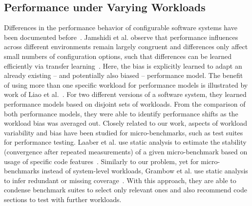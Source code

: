 \subsection{Performance under Varying Workloads}
Differences in the performance behavior of configurable software systems have been documented before~\cite{jamishidi_transfer_2017,alves_sampling_2020}. Jamshidi et al. observe that performance influences across different environments remain largely congruent and differences only affect small numbers of configuration options, such that differences can be learned efficiently via transfer learning~\cite{jamishidi_transfer_2017,jamshidi_learning_2018,jamshidi_transfer_gp_2017,ding_bayesian_2020}. Here, the bias is explicitly learned to adapt an already existing – and potentially also biased -- performance model. The benefit of using more than one specific workload for performance models is illustrated by work of Liao et al.~\cite{liao_2020_using_emse}. For two different versions of a software system, they learned performance models based on disjoint sets of workloads. From the comparison of both performance models, they were able to identify performance shifts as the workload bias was averaged out.
Closely related to our work, aspects of workload variability and bias have been studied for micro-benchmarks, such as test suites for performance testing. Laaber et al. use static analysis to estimate the stability (convergence after repeated measurements) of a given micro-benchmark based on usage of specific code features~\cite{laaber_emse_2021}. Similarly to our problem, yet for micro-benchmarks instead of system-level workloads, Grambow et al. use static analysis to infer redundant or missing coverage~\cite{grambow_peerj_2021}. With this approach, they are able to condense benchmark suites to select only relevant ones and also recommend code sections to test with further workloads.


